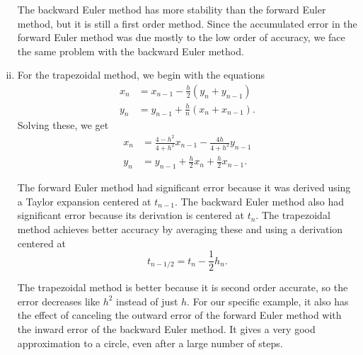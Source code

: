\begin{solution}
\begin{enumerate}[(i)]
    The backward Euler method has more stability than the forward Euler method, but it is still a first order method. Since the accumulated error in the forward Euler method was due mostly to the low order of accuracy, we face the same problem with the backward Euler method.
    \item
    For the trapezoidal method, we begin with the equations
    \begin{align*}
      x_n &= x_{n-1} - \frac{h}{2}(y_n + y_{n-1}) \\
      y_n &= y_{n-1} + \frac{h}{n}(x_n + x_{n-1}).
    \end{align*}
    Solving these, we get
    \begin{align*}
      x_n &= \frac{4 - h^2}{4 + h^2} x_{n-1} - \frac{4h}{4 + h^2} y_{n-1} \\
      y_n &= y_{n-1} + \frac{h}{2} x_n + \frac{h}{2} x_{n-1}.
    \end{align*}
    
    The forward Euler method had significant error because it was derived using a Taylor expansion centered at $t_{n-1}$. The backward Euler method also had significant error because its derivation is centered at $t_n$. The trapezoidal method achieves better accuracy by averaging these and using a derivation centered at 
    \[
      t_{n-1/2} = t_n - \frac12 h_n.
    \]
    
    The trapezoidal method is better because it is second order accurate, so the error decreases like $h^2$ instead of just $h$. For our specific example, it also has the effect of canceling the outward error of the forward Euler method with the inward error of the backward Euler method. It gives a very good approximation to a circle, even after a large number of steps.
  \end{enumerate}
  
\end{solution}